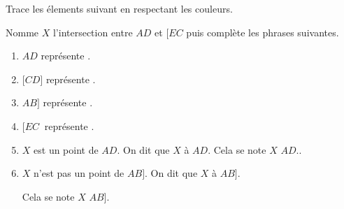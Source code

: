 \documentclass[../../syllabus_1.tex]{subfiles}
\begin{document}
\newpage
\begin{exercise}
    Trace les élements suivant en respectant les couleurs.



    Nomme \(X\) l'intersection entre \(AD\) et \(\lbrack EC\) puis complète les
    phrases suivantes.

    \begin{enumerate}[itemsep=2em]
        \item \(AD\) représente \dotfill.
        \item \(\lbrack CD\rbrack\) représente \dotfill.
        \item \(AB\rbrack\) représente \dotfill.
        \item \(\lbrack EC\ \) représente \dotfill.
        \item \(X\) est un point de \(AD\). On dit que \(X\) \dotfill à \(AD\). Cela
              se note \(X\)\makebox[1cm]{\dotfill} \(AD.\).
        \item \(X\) n'est pas un point de \(AB\rbrack\). On dit que \(X\) \dotfill à
              \(AB\rbrack\). \par
              Cela se note \(X\) \makebox[1cm]{\dotfill} \(AB]\).
    \end{enumerate}
\end{exercise}
\end{document}
